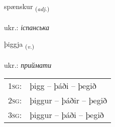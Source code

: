 \documentclass[frontgrid, backgrid]{flacards}\usepackage[]{graphicx}\usepackage[]{xcolor}
\begin{document}
\renewcommand{\flhead}{\vskip5pt \fboxsep=0pt {\small\bfseries\footnotesize Lýsingarorð | прикметник}}
\renewcommand{\fcfoot}{\vskip5pt \fboxsep=0pt \hspace{2pt}{\small\bfseries\footnotesize 2K}}

\renewcommand{\blhead}{\vskip5pt {\small\bfseries\footnotesize Lýsingarorð | прикметник }}
\renewcommand{\bcfoot}{\vskip5pt \hspace{2pt}{\small\bfseries\footnotesize 2K}}


{spænskur \small{\textsubscript{(\textit{adj.})}} \\[1ex] %
\textphonetic{[spainskʏr]} \\
ukr.: \emph{іспанська} \\  [2ex]
\renewcommand*{\arraystretch}{0.8}
}

\renewcommand{\flhead}{\vskip5pt \fboxsep=0pt {\small\bfseries\footnotesize Sagnorð | дієслово}}
\renewcommand{\fcfoot}{\vskip5pt \fboxsep=0pt \hspace{2pt}{\small\bfseries\footnotesize 2K}}

\renewcommand{\blhead}{\vskip5pt {\small\bfseries\footnotesize Sagnorð | дієслово }}
\renewcommand{\bcfoot}{\vskip5pt \hspace{2pt}{\small\bfseries\footnotesize 2K}}


{þiggja \small{\textsubscript{(\textit{v.})}} \\[1ex] %
\textphonetic{[θɪca]} \\
ukr.: \emph{приймати} \\  [2ex]
\renewcommand*{\arraystretch}{0.8}
\begin{tabular}{p{1cm}l}
\textsc{1sg}: & þigg -- þáði -- þegið \\ 
\textsc{2sg}: & þiggur -- þáðir -- þegið \\ 
\textsc{3sg}: & þiggur -- þáði -- þegið \\ 
\end{tabular}
}
\end{document}

